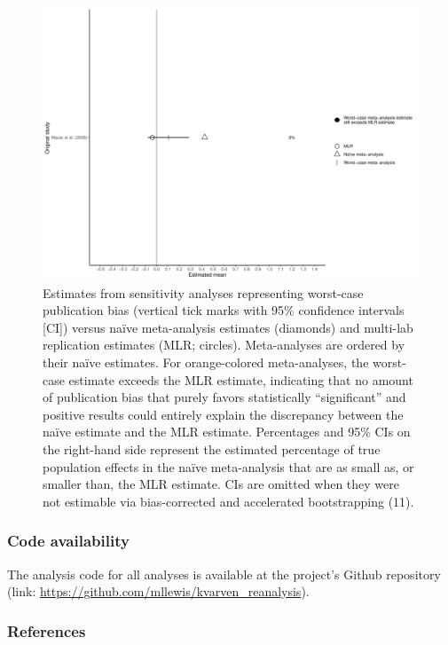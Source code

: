 \documentclass[12pt]{article}
\begin{document}
\begin{figure}[h!]
\centering
     \includegraphics[width=7in]{../results/analysis_2/forest.pdf}
      \caption{Estimates from sensitivity analyses representing worst-case publication bias (vertical tick marks with 95\% confidence intervals [CI]) versus naïve meta-analysis estimates (diamonds) and multi-lab replication estimates (MLR; circles). Meta-analyses are ordered by their naïve estimates. For orange-colored meta-analyses, the worst-case estimate exceeds the MLR estimate, indicating that no amount of publication bias that purely favors statistically “significant” and positive results could entirely explain the discrepancy between the naïve estimate and the MLR estimate. Percentages and 95\% CIs on the right-hand side represent the estimated percentage of true population effects in the naïve meta-analysis that are as small as, or smaller than, the MLR estimate. CIs are omitted when they were not estimable via bias-corrected and accelerated bootstrapping (11).}
\end{figure}
\pagebreak


\subsubsection*{Code availability}
The analysis code for all analyses is available at the project’s Github repository (link: \url{https://github.com/mllewis/kvarven_reanalysis}).


\subsubsection*{References}
\end{document}
